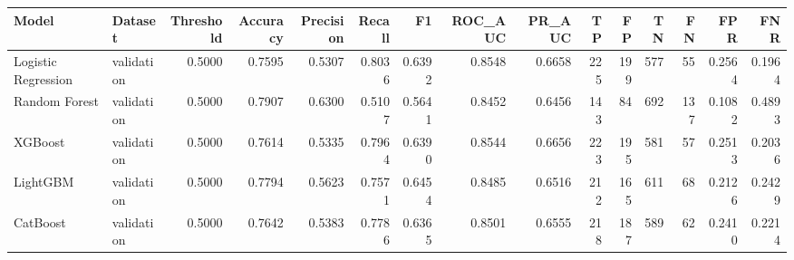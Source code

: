 \begin{tabular}{llrrrrrrrrrrrrr}
\toprule
Model & Dataset & Threshold & Accuracy & Precision & Recall & F1 & ROC_AUC & PR_AUC & TP & FP & TN & FN & FPR & FNR \\
\midrule
Logistic Regression & validation & 0.5000 & 0.7595 & 0.5307 & 0.8036 & 0.6392 & 0.8548 & 0.6658 & 225 & 199 & 577 & 55 & 0.2564 & 0.1964 \\
Random Forest & validation & 0.5000 & 0.7907 & 0.6300 & 0.5107 & 0.5641 & 0.8452 & 0.6456 & 143 & 84 & 692 & 137 & 0.1082 & 0.4893 \\
XGBoost & validation & 0.5000 & 0.7614 & 0.5335 & 0.7964 & 0.6390 & 0.8544 & 0.6656 & 223 & 195 & 581 & 57 & 0.2513 & 0.2036 \\
LightGBM & validation & 0.5000 & 0.7794 & 0.5623 & 0.7571 & 0.6454 & 0.8485 & 0.6516 & 212 & 165 & 611 & 68 & 0.2126 & 0.2429 \\
CatBoost & validation & 0.5000 & 0.7642 & 0.5383 & 0.7786 & 0.6365 & 0.8501 & 0.6555 & 218 & 187 & 589 & 62 & 0.2410 & 0.2214 \\
\bottomrule
\end{tabular}
